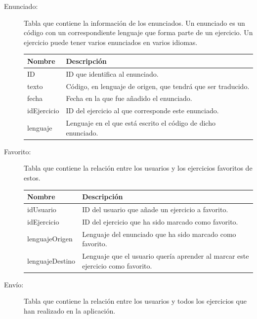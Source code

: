 \begin{description}
\item[Enunciado:] Tabla que contiene la información de los enunciados. Un enunciado es un código con un correspondiente lenguaje que forma parte de un ejercicio. Un ejercicio puede tener varios enunciados en varios idiomas.

\begin{tabularx}{14cm}{|l|X|}
\hline
\textbf{Nombre} & \textbf{Descripción}                                                              \\ \hline
ID       & ID que identifica al enunciado. \\ \hline
texto     & Código, en lenguaje de origen, que tendrá que ser traducido.                                           \\ \hline
fecha     & Fecha en la que fue añadido el enunciado.                                           \\ \hline
idEjercicio     & ID del ejercicio al que corresponde este enunciado.                                           \\ \hline
lenguaje     & Lenguaje en el que está escrito el código de dicho enunciado.                                           \\ \hline
\end{tabularx}

\item[Favorito:] Tabla que contiene la relación entre los usuarios y los ejercicios favoritos de estos.

\begin{tabularx}{14cm}{|l|X|}
\hline
\textbf{Nombre} & \textbf{Descripción}                                                              \\ \hline
idUsuario       & ID del usuario que añade un ejercicio a favorito. \\ \hline
idEjercicio     & ID del ejercicio que ha sido marcado como favorito.                                           \\ \hline
lenguajeOrigen     & Lenguaje del enunciado que ha sido marcado como favorito.                                           \\ \hline
lenguajeDestino     & Lenguaje que el usuario quería aprender al marcar este ejercicio como favorito.                                           \\ \hline
\end{tabularx}

\item[Envío:] Tabla que contiene la relación entre los usuarios y todos los ejercicios que han realizado en la aplicación.


\end{description}
